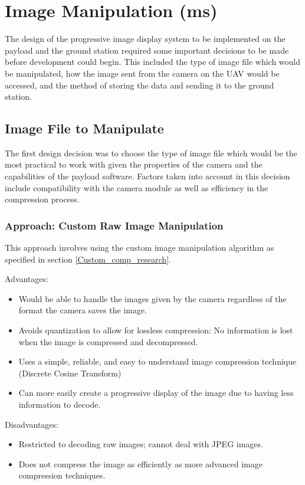 \section{Image Manipulation (ms)}
\label{sec:progressiveimagedisplay}

The design of the progressive image
display system to be implemented on the
payload and the ground station required some
important decisions to be made before 
development could begin. This included
the type of image file which would be
manipulated, how the image sent from the camera on 
the UAV would be accessed,
and the method of storing the data
and sending it to the ground station.

\subsection{Image File to Manipulate}

The first design decision was to choose the type of image 
file which would be the most practical to work with given
the properties of the camera and the
capabilities of the payload software. Factors taken into
account in this decision include compatibility with the 
camera module as well as efficiency in the compression
process.

\subsubsection{Approach: Custom Raw Image Manipulation}

This approach involves using the custom image 
manipulation algorithm as specified 
in section \ref{Custom_comp_research}.

Advantages:
\begin{itemize}
	\item Would be able to handle the images
		given by the camera regardless of the format
		the camera saves the image.
	\item Avoids quantization to allow 
		for lossless compression: No information is
		lost when the image is 
		compressed and decompressed.
	\item Uses a simple, reliable, and easy to 
		understand image compression technique
		(Discrete Cosine Transform)
	\item Can more easily create a progressive
		display of the image due to having less
		information to decode.
\end{itemize}

Disadvantages:
\begin{itemize}
	\item Restricted to decoding raw images; 
		cannot deal with JPEG images.
	\item Does not compress the image as 
		efficiently as more advanced 
		image compression techniques.
\end{itemize}


